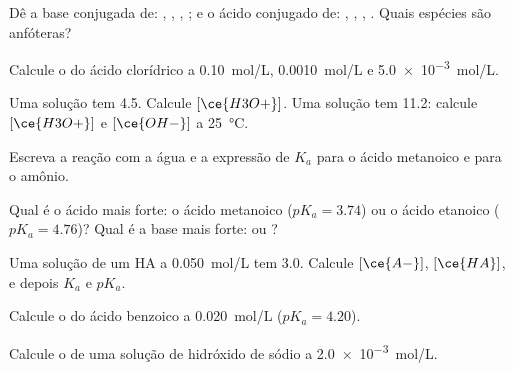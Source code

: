 \begin{exercise}[$\star$]\label{exo:g12:ka-and-pka:1}
Dê a base conjugada de: , , , ; e o
ácido conjugado de: , , , . Quais
espécies são anfóteras?
\end{exercise}

\begin{exercise}[$\star$]\label{exo:g12:ka-and-pka:2}
Calcule o  do ácido clorídrico a \qty{0.10}{mol/L},
\qty{0.0010}{mol/L} e \qty{5.0e-3}{mol/L}.
\end{exercise}

\begin{exercise}[$\star$]\label{exo:g12:ka-and-pka:3}
Uma solução tem  4.5. Calcule $[\ce{H3O+}]$. Uma solução tem  11.2:
calcule $[\ce{H3O+}]$ e $[\ce{OH-}]$ a \qty{25}{\celsius}.
\end{exercise}

\begin{exercise}[$\star$]\label{exo:g12:ka-and-pka:4}
Escreva a reação com a água e a expressão de $K_a$ para o ácido
metanoico e para o  amônio.
\end{exercise}

\begin{exercise}[$\star$]\label{exo:g12:ka-and-pka:5}
Qual é o ácido mais forte: o ácido metanoico ($pK_a = 3.74$) ou o ácido
etanoico ($pK_a = 4.76$)? Qual é a base mais forte:  ou
?
\end{exercise}

\begin{exercise}[$\star\star$]\label{exo:g12:ka-and-pka:6}
Uma solução de um  HA a \qty{0.050}{mol/L} tem  3.0.
Calcule $[\ce{A-}]$, $[\ce{HA}]$, e depois $K_a$ e $pK_a$.
\end{exercise}

\begin{exercise}[$\star\star$]\label{exo:g12:ka-and-pka:7}
Calcule o  do ácido benzoico a \qty{0.020}{mol/L} ($pK_a = 4.20$).
\end{exercise}

\begin{exercise}[$\star\star$]\label{exo:g12:ka-and-pka:8}
Calcule o  de uma solução de hidróxido de sódio a
\qty{2.0e-3}{mol/L}.
\end{exercise}

